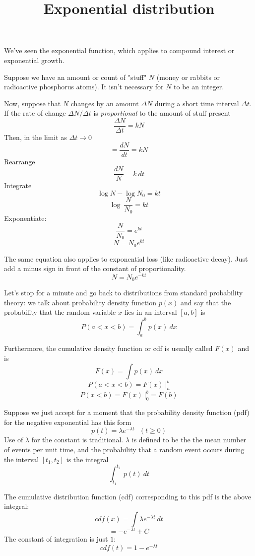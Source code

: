 \documentclass[11pt, oneside]{article}
\title{Exponential distribution}
\date{}
\begin{document}
\maketitle
\Large


\label{sec:Exponential_distribution}
We've seen the exponential function, which applies to compound interest or exponential growth.  

Suppose we have an amount or count of "stuff" $N$ (money or rabbits or radioactive phosphorus atoms).  It isn't necessary for $N$ to be an integer.

Now, suppose that $N$ changes by an amount $\Delta N$ during a short time interval $\Delta t$.  If the rate of change $\Delta N/\Delta t$ is \emph{proportional} to the amount of stuff present 
\[ \frac{\Delta N}{\Delta t} = k N \]
Then, in the limit as $\Delta t \rightarrow 0$
\[ = \frac{dN}{dt} = k N \]
Rearrange
\[ \frac{dN}{N} = k \ dt \]
Integrate
\[ \log N - \log N_0 =  kt \]
\[ \log \ \frac{N}{N_0} =  kt \]
Exponentiate:
\[ \frac{N}{N_0} = e^{kt} \]
\[ N = N_0 e^{kt} \]

The same equation also applies to exponential loss (like radioactive decay).  Just add a minus sign in front of the constant of proportionality.
\[ N = N_0 e^{-kt} \]

Let's stop for a minute and go back to distributions from standard probability theory:   we talk about probability density function $p(x)$ and say that the probability that the random variable $x$ lies in an interval $[a,b]$ is
\[ P(a < x < b) = \int_a^b p(x) \ dx \]

Furthermore, the cumulative density function or cdf is usually called $F(x)$ and is
\[ F(x) = \int p(x) \ dx \]
\[ P(a < x < b) = F(x) \ \bigg |_a^b \]
\[ P( x < b) = F(x) \ \bigg |_0^b = F(b) \]

Suppose we just accept for a moment that the probability density function (pdf) for the negative exponential has this form
\[ p(t) = \lambda e^{-\lambda t} \ \ \ (t \ge 0) \]
Use of $\lambda$ for the constant is traditional.  $\lambda$ is defined to be the the mean number of events per unit time, and the probability that a random event occurs during the interval $[t_1,t_2]$ is the integral
\[ \int_{t_1}^{t_2} \ p(t) \ dt \]

The cumulative distribution function (cdf) corresponding to this pdf is the above integral:
\[ cdf(x) = \int \lambda e^{-\lambda t} \ dt \]
\[ =  - e^{-\lambda t} + C \]
The constant of integration is just $1$:
\[ cdf(t) = 1 - e^{-\lambda t} \]
\end{document}

